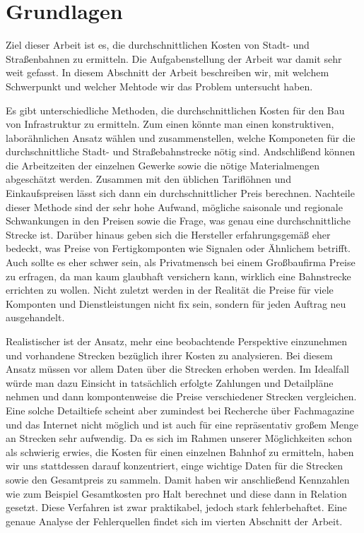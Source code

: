 \section{Grundlagen}

Ziel dieser Arbeit ist es, die durchschnittlichen Kosten von Stadt- und Straßenbahnen zu ermitteln. Die Aufgabenstellung der Arbeit war damit sehr weit gefasst. In diesem Abschnitt der Arbeit beschreiben wir, mit welchem Schwerpunkt und welcher Mehtode wir das Problem untersucht haben.


Es gibt unterschiedliche Methoden, die durchschnittlichen Kosten für den Bau von Infrastruktur zu ermitteln. Zum einen könnte man einen konstruktiven, laborähnlichen Ansatz wählen und zusammenstellen, welche Komponeten für die durchschnittliche Stadt- und Straßebahnstrecke nötig sind. Andschlißend können die Arbeitzeiten der einzelnen Gewerke sowie die nötige Materialmengen abgeschätzt werden. Zusammen mit den üblichen Tariflöhnen und Einkaufspreisen lässt sich dann ein durchschnittlicher Preis berechnen. Nachteile dieser Methode sind der sehr hohe Aufwand, mögliche saisonale und regionale Schwankungen in den Preisen sowie die Frage, was genau eine durchschnittliche Strecke ist. Darüber hinaus geben sich die Hersteller erfahrungsgemäß eher bedeckt, was Preise von Fertigkomponten wie Signalen oder Ähnlichem betrifft. Auch sollte es eher schwer sein, als Privatmensch bei einem Großbaufirma Preise zu erfragen, da man kaum glaubhaft versichern kann, wirklich eine Bahnstrecke errichten zu wollen. Nicht zuletzt werden in der Realität die Preise für viele Komponten und Dienstleistungen nicht fix sein, sondern für jeden Auftrag neu ausgehandelt.

Realistischer ist der Ansatz, mehr eine beobachtende Perspektive einzunehmen und vorhandene Strecken bezüglich ihrer Kosten zu analysieren. Bei diesem Ansatz müssen vor allem Daten über die Strecken erhoben werden. Im Idealfall würde man dazu Einsicht in tatsächlich erfolgte Zahlungen und Detailpläne nehmen und dann kompontenweise die Preise verschiedener Strecken vergleichen. Eine solche Detailtiefe scheint aber zumindest bei Recherche über Fachmagazine und das Internet nicht möglich und ist auch für eine repräsentativ großem Menge an Strecken sehr aufwendig. Da es sich im Rahmen unserer Möglichkeiten schon als schwierig erwies, die Kosten für einen einzelnen Bahnhof zu ermitteln, haben wir uns stattdessen darauf konzentriert, einge wichtige Daten für die Strecken sowie den Gesamtpreis zu sammeln. Damit haben wir anschließend Kennzahlen wie zum Beispiel Gesamtkosten pro Halt berechnet und diese dann in Relation gesetzt. Diese Verfahren ist zwar praktikabel, jedoch stark fehlerbehaftet. Eine genaue Analyse der Fehlerquellen findet sich im vierten Abschnitt der Arbeit.

